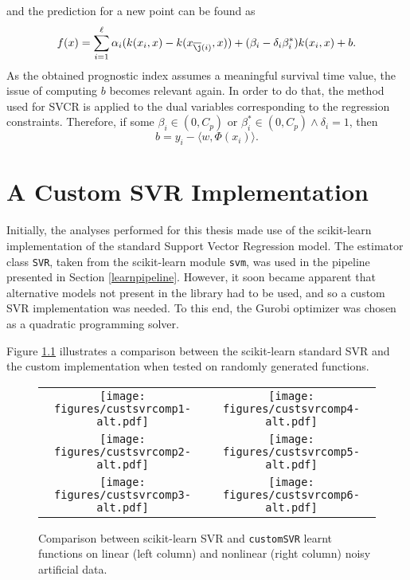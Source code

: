 \documentclass[12pt]{report}
\begin{document}
and the prediction for a new point can be found as
\begin{equation} \label{model2f}
f(x) = \sum_{i=1}^{\ell}\alpha_{i}(k(x_{i},x) - k(x_{\overline{\j}(i)},x))+(\beta_{i}-\delta_{i}\beta_{i}^{*})k(x_{i},x)+b \text{.}
\end{equation}
As the obtained prognostic index assumes a meaningful survival time value, the issue of computing $b$ becomes relevant again. In order to do that, the method used for SVCR is applied to the dual variables corresponding to the regression constraints. Therefore, if some $\beta_{i} \in (0,C_{p})$ or $\beta_{i}^{*} \in (0,C_{p}) \wedge \delta_{i} = 1$, then
\begin{equation} \label{model2b3}
b = y_{i} - \langle w,\Phi(x_{i})\rangle \text{.}
\end{equation}

\chapter{A Custom SVR Implementation}
\label{chcustsvr}
Initially, the analyses performed for this thesis made use of the scikit-learn \cite{sklearn} implementation of the standard Support Vector Regression model. The estimator class \texttt{SVR}, taken from the scikit-learn module \texttt{svm}, was used in the pipeline presented in Section \ref{learnpipeline}. However, it soon became apparent that alternative models not present in the library had to be used, and so a custom SVR implementation was needed. To this end, the Gurobi optimizer \cite{gurobi} was chosen as a quadratic programming solver.

Figure \ref{custsvrfig} illustrates a comparison between the scikit-learn standard SVR and the custom implementation when tested on randomly generated functions.

\begin{figure}[hp]
	\vspace*{-0.8cm}
	\begin{adjustwidth}{-1.5in}{-1in}
  	\centering
  	\begin{tabular}{cc}
  		\texttt{[image: figures/custsvrcomp1-alt.pdf]} & 
  		\texttt{[image: figures/custsvrcomp4-alt.pdf]} \\
		\texttt{[image: figures/custsvrcomp2-alt.pdf]} &
		\texttt{[image: figures/custsvrcomp5-alt.pdf]} \\
		\texttt{[image: figures/custsvrcomp3-alt.pdf]} &
		\texttt{[image: figures/custsvrcomp6-alt.pdf]} \\
  	\end{tabular}
  	\end{adjustwidth}
  	\vspace*{-0.2cm}
  	\caption{Comparison between scikit-learn SVR and \texttt{customSVR} learnt functions on linear (left column) and nonlinear (right column) noisy artificial data.}
  	\label{custsvrfig}
\end{figure}
\end{document}
